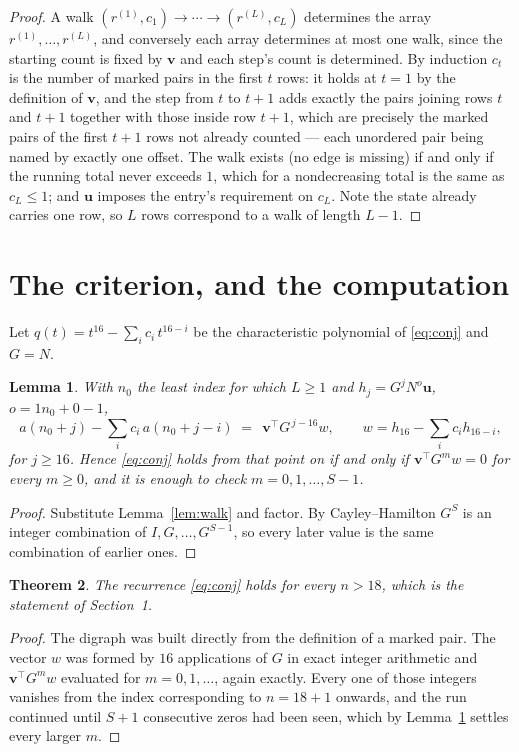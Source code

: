 \documentclass[11pt,a4paper]{article}
\theoremstyle{plain}
\newtheorem{theorem}{Theorem}
\newtheorem{lemma}[theorem]{Lemma}
\theoremstyle{definition}
\begin{document}
\begin{proof}
A walk $(r^{(1)},c_1)\to\cdots\to(r^{(L)},c_L)$ determines the array
$r^{(1)},\dots,r^{(L)}$, and conversely each array determines at most one walk, since the
starting count is fixed by $\mathbf{v}$ and each step's count is determined. By induction
$c_t$ is the number of marked pairs in the first $t$ rows: it holds at $t=1$ by the
definition of $\mathbf{v}$, and the step from $t$ to $t+1$ adds exactly the pairs joining
rows $t$ and $t+1$ together with those inside row $t+1$, which are precisely the marked
pairs of the first $t+1$ rows not already counted --- each unordered pair being named by
exactly one offset. The walk exists (no edge is missing) if and only if the running total
never exceeds $1$, which for a nondecreasing total is the same as $c_L\le1$; and
$\mathbf{u}$ imposes the entry's requirement on $c_L$. Note the state already carries one
row, so $L$ rows correspond to a walk of length $L-1$.
\end{proof}

\section{The criterion, and the computation}

Let $q(t)=t^{16}-\sum_i c_i\,t^{16-i}$ be the characteristic polynomial of
\eqref{eq:conj} and $G=N$.

\begin{lemma}\label{lem:crit}
With $n_0$ the least index for which $L\ge1$ and $h_j=G^{j}N^{o}\mathbf{u}$,
$o=1n_0+0-1$,
\[
a(n_0+j)-\sum_i c_i\,a(n_0+j-i)\;=\;\,\mathbf{v}^{\!\top}G^{\,j-16}w,
\qquad w=h_{16}-\sum_i c_i h_{16-i},
\]
for $j\ge16$. Hence \eqref{eq:conj} holds from that point on if and only if
$\mathbf{v}^{\!\top}G^{m}w=0$ for every $m\ge0$, and it is enough to check
$m=0,1,\dots,S-1$.
\end{lemma}

\begin{proof}
Substitute Lemma~\ref{lem:walk} and factor. By Cayley--Hamilton $G^{S}$ is an integer
combination of $I,G,\dots,G^{S-1}$, so every later value is the same combination of earlier
ones.
\end{proof}

\begin{theorem}
The recurrence \eqref{eq:conj} holds for every $n>18$, which is the statement of
Section~1.
\end{theorem}

\begin{proof}
The digraph was built directly from the definition of a marked pair. The vector $w$ was
formed by $16$ applications of $G$ in exact integer arithmetic and
$\mathbf{v}^{\!\top}G^{m}w$ evaluated for $m=0,1,\dots$, again exactly. Every one of
those integers vanishes from the index corresponding to $n=18+1$ onwards, and the run
continued until $S+1$ consecutive zeros had been seen, which by Lemma~\ref{lem:crit}
settles every larger $m$.
\end{proof}
\end{document}

